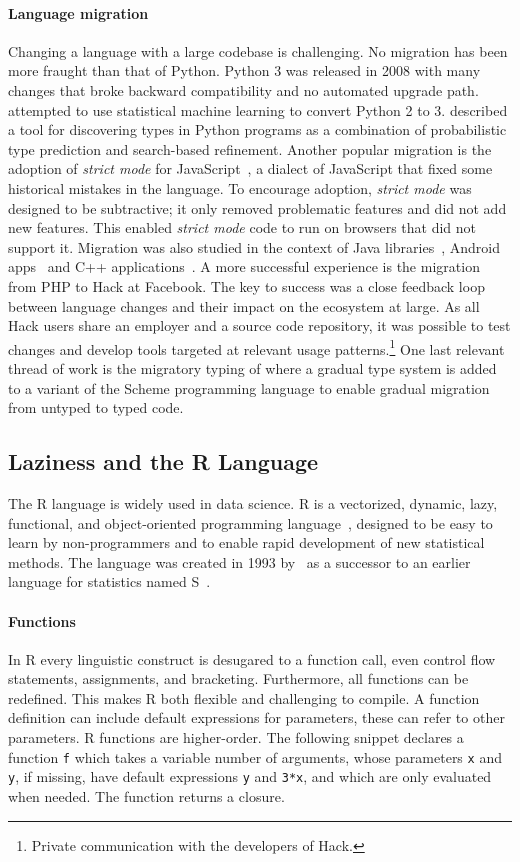 \documentclass[review,screen,acmsmall]{acmart}
\renewcommand{\c}[1]{\lstinline |#1|\xspace}
\begin{document}
\paragraph{Language migration} Changing a language with a large codebase is
challenging. No migration has been more fraught than that of Python. Python 3
was released in 2008 with many changes that broke backward compatibility and no
automated upgrade path. \citet{Agg15} attempted to use statistical machine
learning to convert Python 2 to 3. \citet{Pra20} described a tool for
discovering types in Python programs as a combination of probabilistic type
prediction and search-based refinement. Another popular migration is the
adoption of \emph{strict mode} for JavaScript~\cite{Js20}, a dialect of
JavaScript that fixed some historical mistakes in the language. To
encourage adoption, \emph{strict mode} was designed to be subtractive; it only
removed problematic features and did not add new features. This enabled
\emph{strict mode} code to run on browsers that did not support it. Migration
was also studied in the context of Java libraries~\cite{Xu19}, Android
apps~\cite{Orso20} and C++ applications~\cite{OB20}. A more successful
experience is the migration from PHP to Hack at Facebook. The key to success was
a close feedback loop between language changes and their impact on the ecosystem
at large. As all Hack users share an employer and a source code repository, it
was possible to test changes and develop tools targeted at relevant usage
patterns.\footnote{Private communication with the developers of Hack.} One last
relevant thread of work is the migratory typing of \citet{matthias06} where a
gradual type system is added to a variant of the Scheme programming language to
enable gradual migration from untyped to typed code.

\subsection{Laziness and the R Language}

The R language is widely used in data science. R is a vectorized, dynamic, lazy,
functional, and object-oriented programming language~\cite{ecoop12}, designed to
be easy to learn by non-programmers and to enable rapid development of new
statistical methods. The language was created in 1993 by~\citet{R96} as a
successor to an earlier language for statistics named S~\cite{S88}.

\paragraph{Functions}
In R every linguistic construct is desugared to a function call, even control
flow statements, assignments, and bracketing. Furthermore, all functions can be
redefined. This makes R both flexible and challenging to compile. A function
definition can include default expressions for parameters, these can refer to
other parameters. R functions are higher-order. The following snippet declares a
function \c f which takes a variable number of arguments, whose parameters
\c x and \c y, if missing, have default expressions \c y and
\c{3*x}, and which are only evaluated when needed. The function returns a
closure.
\end{document}
